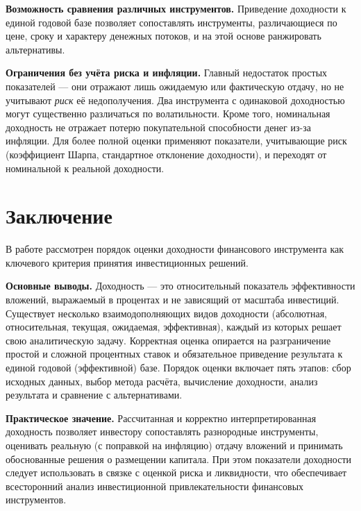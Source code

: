 \documentclass[14pt, a4paper]{extarticle}
\begin{document}
\textbf{Возможность сравнения различных инструментов.} Приведение доходности к
единой годовой базе позволяет сопоставлять инструменты, различающиеся по цене,
сроку и характеру денежных потоков, и на этой основе ранжировать альтернативы.

\textbf{Ограничения без учёта риска и инфляции.} Главный недостаток простых
показателей — они отражают лишь ожидаемую или фактическую отдачу, но не
учитывают \emph{риск} её недополучения. Два инструмента с одинаковой
доходностью могут существенно различаться по волатильности. Кроме того,
номинальная доходность не отражает потерю покупательной способности денег из-за
инфляции. Для более полной оценки применяют показатели, учитывающие риск
(коэффициент Шарпа, стандартное отклонение доходности), и переходят от
номинальной к реальной доходности.

\section*{Заключение}

В работе рассмотрен порядок оценки доходности финансового инструмента как
ключевого критерия принятия инвестиционных решений.

\textbf{Основные выводы.} Доходность — это относительный показатель
эффективности вложений, выражаемый в процентах и не зависящий от масштаба
инвестиций. Существует несколько взаимодополняющих видов доходности
(абсолютная, относительная, текущая, ожидаемая, эффективная), каждый из которых
решает свою аналитическую задачу. Корректная оценка опирается на разграничение
простой и сложной процентных ставок и обязательное приведение результата к
единой годовой (эффективной) базе. Порядок оценки включает пять этапов: сбор
исходных данных, выбор метода расчёта, вычисление доходности, анализ результата
и сравнение с альтернативами.

\textbf{Практическое значение.} Рассчитанная и корректно
интерпретированная доходность позволяет инвестору сопоставлять разнородные
инструменты, оценивать реальную (с поправкой на инфляцию) отдачу вложений и
принимать обоснованные решения о размещении капитала. При этом показатели
доходности следует использовать в связке с оценкой риска и ликвидности, что
обеспечивает всесторонний анализ инвестиционной привлекательности финансовых
инструментов.
\end{document}
